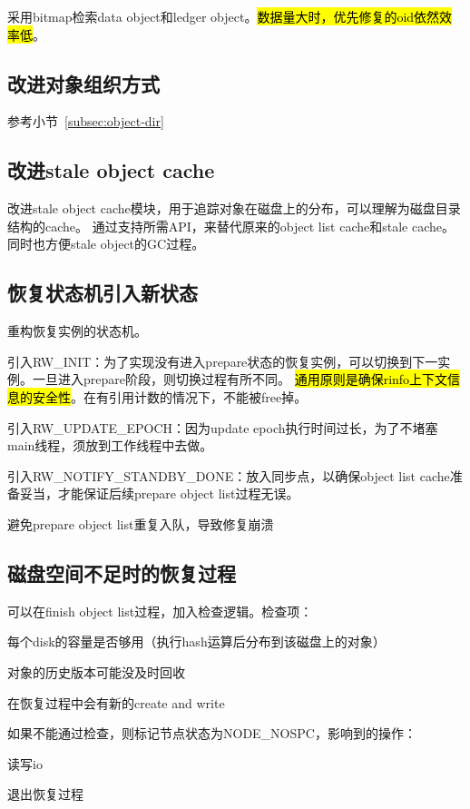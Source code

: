 采用bitmap检索data object和ledger object。\hl{数据量大时，优先修复的oid依然效率低}。

\subsection{改进对象组织方式}

参考小节~\ref{subsec:object-dir}

\subsection{改进stale object cache}

改进stale object cache模块，用于追踪对象在磁盘上的分布，可以理解为磁盘目录结构的cache。
通过支持所需API，来替代原来的object list cache和stale cache。同时也方便stale object的GC过程。

\subsection{恢复状态机引入新状态}

重构恢复实例的状态机。

引入RW\_INIT：为了实现没有进入prepare状态的恢复实例，可以切换到下一实例。一旦进入prepare阶段，则切换过程有所不同。
\hl{通用原则是确保rinfo上下文信息的安全性}。在有引用计数的情况下，不能被free掉。

引入RW\_UPDATE\_EPOCH：因为update epoch执行时间过长，为了不堵塞main线程，须放到工作线程中去做。

引入RW\_NOTIFY\_STANDBY\_DONE：放入同步点，以确保object list cache准备妥当，才能保证后续prepare object list过程无误。

避免prepare object list重复入队，导致修复崩溃

\subsection{磁盘空间不足时的恢复过程}

可以在finish object list过程，加入检查逻辑。检查项：
\begin{enumbox}
\item 每个disk的容量是否够用（执行hash运算后分布到该磁盘上的对象）
\item 对象的历史版本可能没及时回收
\item 在恢复过程中会有新的create and write
\end{enumbox}

如果不能通过检查，则标记节点状态为NODE\_NOSPC，影响到的操作：
\begin{enumbox}
\item 读写io
\item 退出恢复过程
\end{enumbox}

